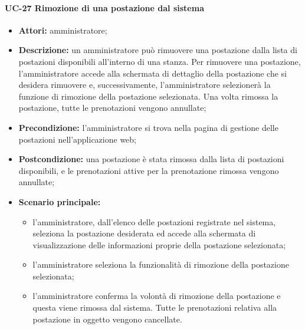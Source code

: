 \paragraph{UC-27 Rimozione di una postazione dal sistema}
\begin{itemize}
    \item \textbf{Attori:} amministratore;
    \item \textbf{Descrizione:} un amministratore pu\`{o} rimuovere una postazione dalla lista di postazioni disponibili all'interno di una stanza. Per rimuovere una postazione, l'amministratore accede alla schermata di dettaglio della postazione che si desidera rimuovere e, successivamente, l'amministratore selezionerà la funzione di rimozione della postazione selezionata. Una volta rimossa la postazione, tutte le prenotazioni vengono annullate;
    \item \textbf{Precondizione:} l'amministratore si trova nella pagina di gestione delle postazioni nell'applicazione web;
    \item \textbf{Postcondizione:} una postazione \`{e} stata rimossa dalla lista di postazioni disponibili, e le prenotazioni attive per la prenotazione rimossa vengono annullate;
    \item \textbf{Scenario principale:}
    \begin{itemize}
        \item l'amministratore, dall'elenco delle postazioni registrate nel sistema, seleziona la postazione desiderata ed accede alla schermata di visualizzazione delle informazioni proprie della postazione selezionata;
        \item l'amministratore seleziona la funzionalità di rimozione della postazione selezionata;
        \item l'amministratore conferma la volontà di rimozione della postazione e questa viene rimossa dal sistema. Tutte le prenotazioni relativa alla postazione in oggetto vengono cancellate.
    \end{itemize}
\end{itemize}


